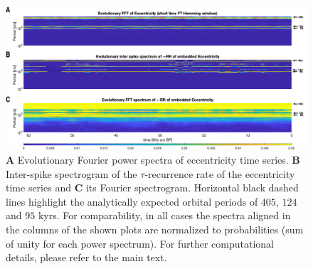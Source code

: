 \documentclass[entropy,article,submit,pdftex,moreauthors]{Definitions/mdpi}
\begin{document}
\begin{figure}
 \centering
 \includegraphics[width=\textwidth]{figures/fig_laskar_spectra}
 \caption{\textbf{A} Evolutionary Fourier power spectra of eccentricity time series. \textbf{B} Inter-spike spectrogram of the $\tau$-recurrence rate of the eccentricity time 
 series and \textbf{C} its Fourier spectrogram. Horizontal black dashed lines highlight the analytically expected orbital periods of $405$, $124$ and $95$ kyrs. 
 For comparability, in all cases the spectra aligned in the columns of the shown plots are normalized to probabilities (sum of unity for 
 each power spectrum). For further computational details, please refer to the main text.}  
\label{fig_laskar_spectra}
\end{figure}
\end{document}
